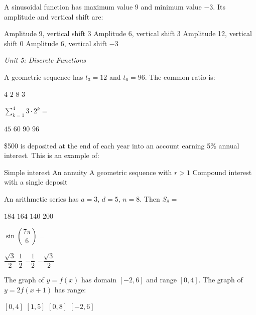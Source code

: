 \documentclass[addpoints]{exam}
\begin{document}
\begin{questions}
\question[1] A sinusoidal function has maximum value 9 and minimum value $-3$. Its
amplitude and vertical shift are:
\begin{choices}
    \choice Amplitude 9, vertical shift 3
    \correctchoice Amplitude 6, vertical shift 3
    \choice Amplitude 12, vertical shift 0
    \choice Amplitude 6, vertical shift $-3$
\end{choices}

\vspace{3mm}
\noindent\textit{Unit 5: Discrete Functions}
\vspace{3mm}

\question[1] A geometric sequence has $t_3 = 12$ and $t_6 = 96$. The common ratio is:
\begin{choices}
    \choice $4$
    \correctchoice $2$
    \choice $8$
    \choice $3$
\end{choices}

\question[1] $\displaystyle\sum_{k=1}^{4} 3 \cdot 2^k =$
\begin{choices}
    \choice $45$
    \choice $60$
    \correctchoice $90$
    \choice $96$
\end{choices}

\question[1] \$500 is deposited at the end of each year into an account earning
5\% annual interest. This is an example of:
\begin{choices}
    \choice Simple interest
    \correctchoice An annuity
    \choice A geometric sequence with $r > 1$
    \choice Compound interest with a single deposit
\end{choices}

\question[1] An arithmetic series has $a = 3$, $d = 5$, $n = 8$. Then $S_8 =$
\begin{choices}
    \choice $184$
    \correctchoice $164$
    \choice $140$
    \choice $200$
\end{choices}

\question[1] $\sin\!\left(\dfrac{7\pi}{6}\right) =$
\begin{choices}
    \choice $\dfrac{\sqrt{3}}{2}$
    \choice $\dfrac{1}{2}$
    \correctchoice $-\dfrac{1}{2}$
    \choice $-\dfrac{\sqrt{3}}{2}$
\end{choices}

\question[1] The graph of $y = f(x)$ has domain $[-2, 6]$ and range $[0, 4]$.
The graph of $y = 2f(x+1)$ has range:
\begin{choices}
    \choice $[0, 4]$
    \choice $[1, 5]$
    \correctchoice $[0, 8]$
    \choice $[-2, 6]$
\end{choices}



\end{questions}
\end{document}

